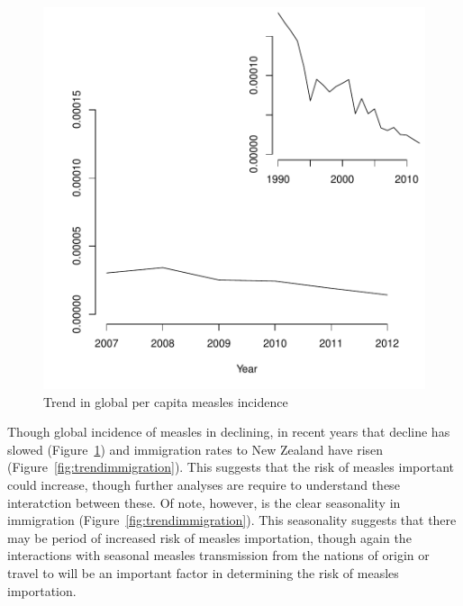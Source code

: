 \documentclass{article}
\begin{document}
\begin{figure}[h!]
\begin{center}
\includegraphics{interimreport1-011}
\end{center}
\caption{Trend in global per capita measles incidence}
\label{fig:trendincidence}
\end{figure}

Though global incidence of measles in declining, in recent years that decline has slowed (Figure~\ref{fig:trendincidence}) and immigration rates to New Zealand have risen (Figure~\ref{fig:trendimmigration}). This suggests that the risk of measles important could increase, though further analyses are require to understand these interatction between these. Of note, however, is the clear seasonality in immigration (Figure~\ref{fig:trendimmigration}). This seasonality suggests that there may be period of increased risk of measles importation, though again the interactions with seasonal measles transmission from the nations of origin or travel to will be an important factor in determining the risk of measles importation.
\end{document}
